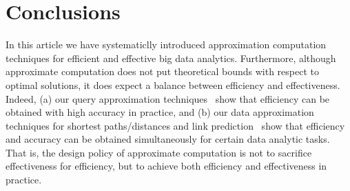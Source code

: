 \section{Conclusions}
\label{sec-conclusion}

In this article we have systematiclly introduced approximation computation techniques for efficient and effective big data analytics.
Furthermore, although approximate computation does not put
theoretical bounds with respect to optimal solutions, it does expect a balance between efficiency and effectiveness. Indeed, (a) our query approximation techniques~\cite{ShuaiMaVLDB12,tods-MaCFHW14,LinMZWH17,MaHWLH17} show that efficiency can be obtained with high accuracy in practice, and (b) our data approximation techniques for shortest paths/distances and link prediction~\cite{MaFLWCH16,MaFLWCH17,HuAMH16,DuanAMHH16,DuanMAMH17} show that efficiency and accuracy can be obtained simultaneously for certain data analytic tasks. That is, the design policy of approximate computation is not to sacrifice effectiveness for efficiency, but to achieve both efficiency and effectiveness in practice.

